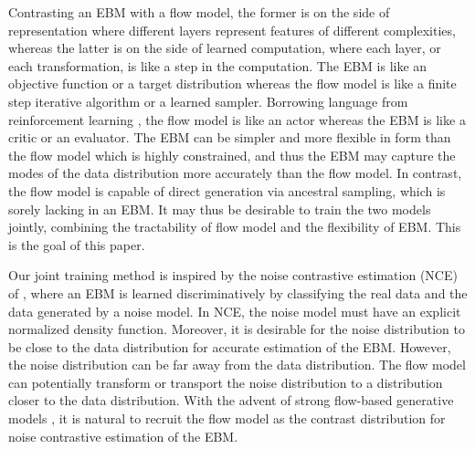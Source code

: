 \documentclass[10pt,twocolumn,letterpaper]{article}
\begin{document}
Contrasting an EBM with a flow model, the former is on the side of representation where different layers represent features of different complexities, whereas the latter is on the side of learned computation, where each layer, or each transformation, is like a step in the computation. The EBM is like an objective function or a target distribution whereas the flow model is like a finite step iterative algorithm or a learned sampler.  Borrowing language from reinforcement learning \cite{finn2016connection}, the flow model is like an actor whereas the EBM is like a critic or an evaluator. The EBM can be simpler and more flexible in form than the flow model which is highly constrained, and thus the EBM may capture  the modes of the data distribution more accurately than the flow model. In contrast, the flow model is capable of direct generation via ancestral sampling,  which is sorely lacking in an EBM. It may thus be desirable to train the two models jointly, combining the tractability of flow model and the flexibility of EBM. This is the goal of this paper.

Our joint training method is inspired by the noise contrastive estimation (NCE) of \cite{gutmann2010noise}, where an EBM is learned discriminatively by classifying the real data and the data generated by a noise model. In NCE, the noise model must have an explicit normalized density function. Moreover, it is desirable for the noise distribution to be close to the data distribution for accurate estimation of the EBM. However, the noise distribution can be far away from the data distribution. The flow model can potentially transform or transport the noise distribution to a distribution closer to the data distribution. With the advent of strong flow-based generative models \cite{dinh2014nice, dinh2016density, kingma2018Glow}, it is natural to recruit the flow model as the contrast distribution for noise contrastive estimation of the EBM.
\end{document}
